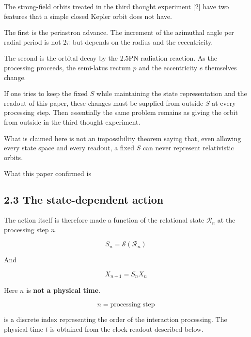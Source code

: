 \documentclass[
  a4paper,
]{article}
\begin{document}
The strong-field orbits treated in the third thought experiment {[}2{]}
have two features that a simple closed Kepler orbit does not have.

The first is the periastron advance. The increment of the azimuthal
angle per radial period is not \(2\pi\) but depends on the radius and
the eccentricity.

The second is the orbital decay by the 2.5PN radiation reaction. As the
processing proceeds, the semi-latus rectum \(p\) and the eccentricity
\(e\) themselves change.

If one tries to keep the fixed \(S\) while maintaining the state
representation and the readout of this paper, these changes must be
supplied from outside \(S\) at every processing step. Then essentially
the same problem remains as giving the orbit from outside in the third
thought experiment.

What is claimed here is not an impossibility theorem saying that, even
allowing every state space and every readout, a fixed \(S\) can never
represent relativistic orbits.

What this paper confirmed is

\begin{center}
\end{center}

\subsection{2.3 The state-dependent
action}\label{the-state-dependent-action}

The action itself is therefore made a function of the relational state
\(\mathcal R_n\) at the processing step \(n\).

\[
\boxed{
S_n=\mathcal S(\mathcal R_n)
}
\]

And

\[
\boxed{
X_{n+1}=S_nX_n
}
\]

Here \(n\) is \textbf{not a physical time}.

\[
\boxed{n=\text{processing step}}
\]

is a discrete index representing the order of the interaction
processing. The physical time \(t\) is obtained from the clock readout
described below.
\end{document}
